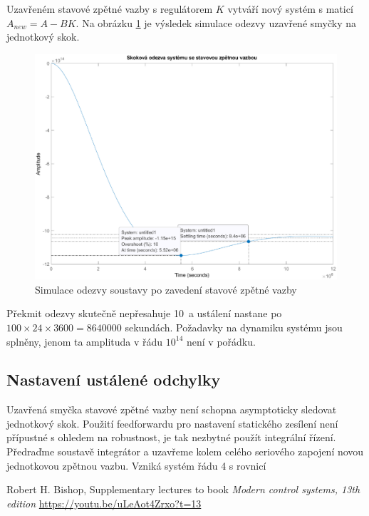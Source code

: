 \documentclass[twoside]{article}
\begin{document}
Uzavřeném stavové zpětné vazby s regulátorem $K$ vytváří nový systém s maticí $A_{new} = A - BK$.
Na obrázku \ref{fig:wrong_gain} je výsledek simulace odezvy uzavřené smyčky na jednotkový skok.
\begin{figure}[htbp]
	\centering
	\includegraphics[width=\linewidth]{skokova_odezva.eps}
	\caption{Simulace odezvy soustavy po zavedení stavové zpětné vazby}
	\label{fig:wrong_gain}
\end{figure}
Překmit odezvy skutečně nepřesahuje 10\ a ustálení nastane po $100 \times 24 \times 3600 = 8640000$ sekundách.
Požadavky na dynamiku systému jsou splněny, jenom ta amplituda v řádu $10^{14}$ není v pořádku.

\subsection{Nastavení ustálené odchylky}
Uzavřená smyčka stavové zpětné vazby není schopna asymptoticky sledovat jednotkový skok. Použití feedforwardu pro nastavení
statického zesílení není přípustné s ohledem na robustnost, je tak nezbytné použít integrální řízení. Předraďme soustavě integrátor
a uzavřeme kolem celého seriového zapojení novou jednotkovou zpětnou vazbu. Vzniká systém řádu 4 s rovnicí


\begin{thebibliography}{9}

	Robert H. Bishop, Supplementary lectures to book \emph{Modern control systems, 13th edition} 
		\url{https://youtu.be/uLeAot4Zrxo?t=13}

\end{thebibliography}
\end{document}
